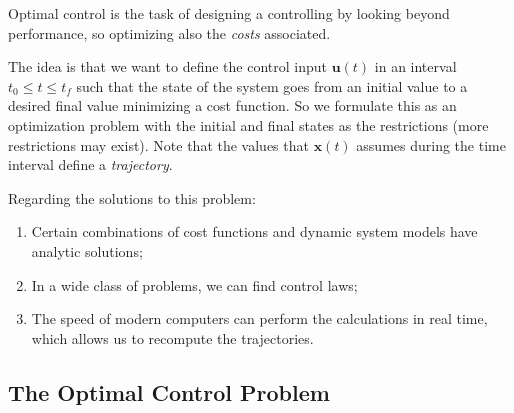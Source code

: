 Optimal control is the task of designing a controlling by looking beyond performance, so optimizing also the \emph{costs} associated.

The idea is that we want to define the control input  $\bm{u}(t)$ in an interval $t_0 \le t\le t_f$ such that the state of the system goes from an initial value to a desired final value minimizing a cost function. So we formulate this as an optimization problem with the initial and final states as the restrictions (more restrictions may exist). Note that the values that $\bm{x}(t)$ assumes during the time interval define a \emph{trajectory}.

Regarding the solutions to this problem:

\begin{enumerate}
    \item Certain combinations of cost functions and dynamic system models have analytic solutions;
    \item In a wide class of problems, we can find control laws;
    \item The speed of modern computers can perform the calculations in real time, which allows us to recompute the trajectories.
\end{enumerate}

\subsection*{The Optimal Control Problem}


